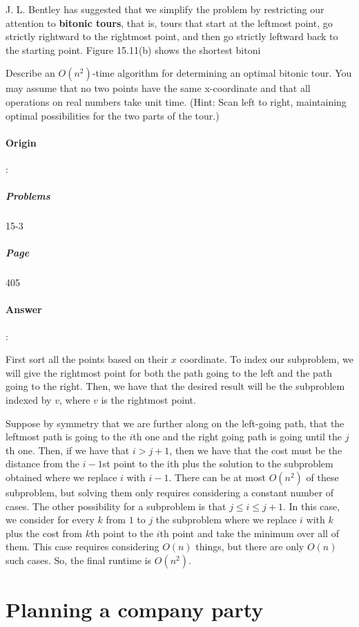 \documentclass{article}
\begin{document}
J. L. Bentley has suggested that we simplify the problem by restricting our attention to \textbf{bitonic tours}, that is, tours that start at the leftmost point, go strictly rightward to the rightmost point, and then go strictly leftward back to the starting point. Figure 15.11(b) shows the shortest bitoni

Describe an $O(n^2)$-time algorithm for determining an optimal bitonic tour. You may assume that no two points have the same x-coordinate and that all operations on real numbers take unit time. (Hint: Scan left to right, maintaining optimal possibilities for the two parts of the tour.)

\paragraph{Origin}:
  \subparagraph{Problems}15-3
  \subparagraph{Page}405
\paragraph{Answer}:



First sort all the points based on their $x$ coordinate. To index our subproblem, we will give the rightmost point for both the path going to the left and the path going to the right. Then, we have that the desired result will be the subproblem indexed by $v$, where $v$ is the rightmost point.

Suppose by symmetry that we are further along on the left-going path, that the leftmost path is going to the $i$th one and the right going path is going until the $j$th one. Then, if we have that $i > j + 1$, then we have that the cost must be the distance from the $i - 1$st point to the ith plus the solution to the subproblem obtained where we replace $i$ with $i - 1$. There can be at most $O(n^2)$ of these subproblem, but solving them only requires considering a constant number of cases. The other possibility for a subproblem is that $j \le i \le j + 1$. In this case, we consider for every $k$ from $1$ to $j$ the subproblem where we replace $i$ with $k$ plus the cost from $k$th point to the $i$th point and take the minimum over all of them. This case requires considering $O(n)$ things, but there are only $O(n)$ such cases. So, the final runtime is $O(n^2)$.


\section{Planning a company party}
\end{document}

